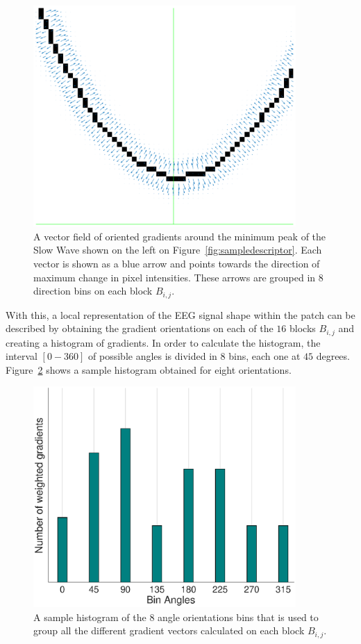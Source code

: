 \documentclass[review]{elsarticle}
\begin{document}
\begin{figure}[h!]
\centering
\includegraphics[width=10cm]{images/swsgrads3.eps}
\caption[Gradients]{A vector field of oriented gradients around the minimum peak of the Slow Wave shown on the left on Figure~\ref{fig:sampledescriptor}.  Each vector is shown as a blue arrow and points towards the direction of maximum change in pixel intensities.  These arrows are grouped in 8 direction bins on each block $B_{i,j}$.}
\label{fig:grads}
\end{figure}

With this, a local representation of the EEG signal shape within the patch can be described by obtaining the gradient orientations on each of the $16$ blocks $B_{i,j}$ and creating a histogram of gradients.  In order to calculate the histogram, the interval $[0-360]$ of possible angles is divided in $8$ bins, each one at $45$ degrees.  Figure~\ref{fig:histogram} shows a sample histogram obtained for eight orientations. 

\begin{figure}[h!]
\centering
\includegraphics[width=10cm]{images/histogramchart.eps}
\caption[Histogram]{A sample histogram of the 8 angle orientations bins that is used to group all the different gradient vectors calculated on each block $B_{i,j}$. }
\label{fig:histogram}
\end{figure}
\end{document}
